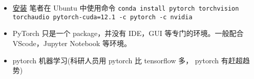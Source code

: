 

\begin{itemize}
\item \href{https://pytorch.org/get-started/locally/}{安装} 笔者在 Ubuntu 中使用命令 \verb|conda install pytorch torchvision torchaudio pytorch-cuda=12.1 -c pytorch -c nvidia|
\item PyTorch 只是一个 package，并没有 IDE，GUI 等专门的环境。一般配合 VScode，Jupyter Notebook 等环境。
\item pytorch 机器学习(科研人员用 pytorch 比 tensorflow 多， pytorch 有赶超趋势)
\end{itemize}

